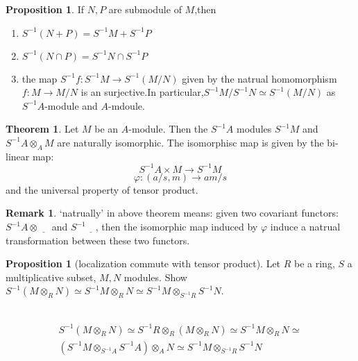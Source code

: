 \documentclass[a4paper,12pt]{article}
\newenvironment{prooff}{{\noindent\it\textcolor{cyan!40!black}{Proof}:}\,}{\par}
\theoremstyle{definition}
\newtheorem{theo}[defn]{Theorem}
\newtheorem{rema}[defn]{Remark}
\newtheorem{prop}[defn]{Proposition}
\begin{document}
\begin{prop}
    If $N,P$ are submodule of $M$,then
    \begin{enumerate}[(1)]
        \item $S^{-1}(N+P)=S^{-1}M+S^{-1}P$
        \item $S^{-1}(N\cap P)=S^{-1}N\cap S^{-1}P$
        \item the map $S^{-1}f:S^{-1}M\rightarrow S^{-1}(M/N)$ given by the natrual homomorphism $f:M\rightarrow M/N$ is an surjective.In particular,$S^{-1}M/S^{-1}N\simeq S^{-1}(M/N)$ as $S^{-1}A$-module and $A$-mdoule.
    \end{enumerate}
    \label{proposition:S-1 commute with quotient,sum and intersect}
\end{prop}
\begin{theo}
    Let $M$ be an $A$-module. Then the $S^{-1}A$ modules $S^{-1}M$ and
    $S^{-1}A\otimes_A M$ are naturally isomorphic. The isomorphisc map is given by the bi-linear map:
    \begin{equation*}
        S^{-1}A\times M\rightarrow S^{-1}M
    \end{equation*}
    \begin{equation*}
        \varphi:(a/s,m)\rightarrow  am/s
    \end{equation*}
    and the universal property of tensor product.
    \label{proposition:S^-1 and S^-1otimes isomorphic}
\end{theo}
\begin{rema}
    ‘natrually’ in above theorem means: given two covariant functors:$S^{-1}A\otimes\underline{\quad}$ and $S^{-1}\underline{\quad}$, then the isomorphic map induced by $\varphi$ induce a natrual transformation between these two functors.
\end{rema}
\begin{prop}[localization commute with tensor product]
    Let $R$ be a ring, $S$ a multiplicative subset, $M, N$ modules.
    Show $S^{-1}\left(M \otimes_R N\right)\simeq S^{-1} M \otimes_R N\simeq S^{-1} M \otimes_{S^{-1} R} S^{-1} N$.
    \label{proposition:localization commute with tensor product}
\end{prop}
\begin{prooff}
    \begin{align*}
        S^{-1}\left(M \otimes_R N\right)\simeq S^{-1}R\otimes_R(M \otimes_R N)\simeq S^{-1}M\otimes_R N\simeq \\
        (S^{-1}M\otimes_{S^{-1}A}S^{-1}A)\otimes_A N \simeq S^{-1} M \otimes_{S^{-1} R} S^{-1} N
    \end{align*}
\end{prooff}
\end{document}
